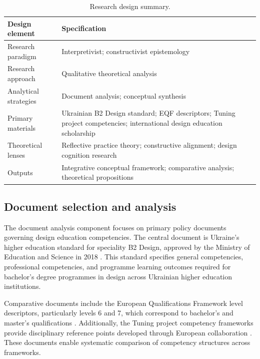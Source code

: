 \documentclass[ed]{acnsart}
\begin{document}
	\begin{table}[htbp]
		\centering
		\caption{Research design summary.}
		\label{tab:research-design}
		\small
		\begin{tabularx}{\textwidth}{@{}lX@{}}
			\toprule
			\hfill \textbf{Design element} & \hfil \textbf{Specification} \\
			\midrule
			Research paradigm & Interpretivist; constructivist epistemology \\
			\addlinespace
			Research approach & Qualitative theoretical analysis \\
			\addlinespace
			Analytical strategies & Document analysis; conceptual synthesis \\
			\addlinespace
			Primary materials & Ukrainian B2 Design standard; EQF descriptors; Tuning project competencies; international design education scholarship \\
			\addlinespace
			Theoretical lenses & Reflective practice theory; constructive alignment; design cognition research \\
			\addlinespace
			Outputs & Integrative conceptual framework; comparative analysis; theoretical propositions \\
			\bottomrule
		\end{tabularx}
	\end{table}
	
	\subsection{Document selection and analysis}
	
	The document analysis component focuses on primary policy documents governing design education competencies. The central document is Ukraine's higher education standard for speciality B2 Design, approved by the Ministry of Education and Science in 2018 \cite{MON2018}. This standard specifies general competencies, professional competencies, and programme learning outcomes required for bachelor's degree programmes in design across Ukrainian higher education institutions.
	
	Comparative documents include the European Qualifications Framework level descriptors, particularly levels 6 and 7, which correspond to bachelor's and master's qualifications \cite{EuropeanCommission2017}. Additionally, the Tuning project competency frameworks provide disciplinary reference points developed through European collaboration \cite{Gonzalez2003}. These documents enable systematic comparison of competency structures across frameworks.
	
\end{document}
